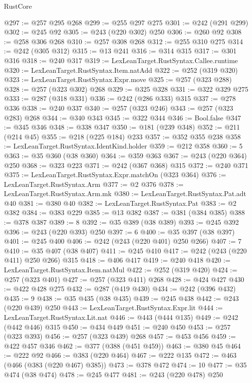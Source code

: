 \begin{lexlean}{RustCore}
\begin{coremodule}
{\begin{coremodule}
{{{{{{@297 := @257 @295 @268
@299 := @255 @297 @275
@301 := @242 (@291 @299)
@302 := @245 @92
@305 := @243 (@220 @302) @250
@306 := @260 @92
@308 := @258 @306 @268
@310 := @257 @308 @268
@312 := @255 @310 @275
@314 := @242 (@305 @312)
@315 := @13 @241
@316 := @314 @315
@317 := @301 @316
@318 := @240 @317
@319 := LexLeanTarget.RustSyntax.Callee.runtime
@320 := LexLeanTarget.RustSyntax.Item.natAdd
@322 := @252 (@319 @320)
@323 := LexLeanTarget.RustSyntax.Expr.move
@325 := @257 (@323 @288)
@328 := @257 (@323 @302) @268
@329 := @325 @328
@331 := @322 @329 @275
@333 := @287 (@318 @331)
@336 := @242 (@286 @333) @315
@337 := @278 @336
@338 := @240 @337
@340 := @257 (@323 @246)
@343 := @257 (@323 @283) @268
@344 := @340 @343
@345 := @322 @344
@346 := Bool.false
@347 := @345 @346
@348 := @338 @347
@350 := @181 (@239 @348)
@352 := @211 (@214 @45)
@355 := @218 (@225 @184) @233
@357 := @352 @355 @238
@358 := LexLeanTarget.RustSyntax.IdentKind.holder
@359 := @212 @358
@360 := 5
@363 := @35 @360 (@38 @360)
@364 := @359 @363
@367 := @243 (@220 @364) @250
@368 := @323 @223
@371 := @242 (@367 @368) @315
@372 := @240 @371
@375 := LexLeanTarget.RustSyntax.Expr.matchOn (@323 @364)
@376 := LexLeanTarget.RustSyntax.Arm
@377 := @2 @376
@378 := LexLeanTarget.RustSyntax.Arm.mk
@380 := LexLeanTarget.RustSyntax.Pat.adt @40
@381 := @380 @40
@382 := LexLeanTarget.RustSyntax.Pat
@383 := @2 @382
@384 := @383 @229
@385 := @13 @382
@387 := @381 (@384 @385)
@388 := @378 @387
@389 := 8
@392 := @35 @389 (@38 @389)
@393 := @245 @392
@396 := @243 (@220 @393) @250
@397 := 6
@400 := @35 @397 (@38 @397)
@401 := @245 @400
@406 := @242 (@243 (@220 @401) @250 @266)
@407 := 7
@410 := @35 @407 (@38 @407)
@411 := @245 @410
@417 := @242 (@243 (@220 @411) @250 @266) @315
@418 := @406 @417
@419 := @240 @418
@420 := LexLeanTarget.RustSyntax.Item.natMul
@422 := @252 (@319 @420)
@424 := @257 (@323 @401)
@427 := @257 (@323 @411) @268
@428 := @424 @427
@430 := @422 @428 @275
@432 := @287 (@419 @430)
@434 := @242 (@396 @432)
@435 := 9
@438 := @35 @435 (@38 @435)
@439 := @245 @438
@442 := @243 (@220 @439) @250
@443 := LexLeanTarget.RustSyntax.Expr.lit
@444 := LexLeanTarget.RustSyntax.Lit.nat
@446 := @443 (@444 @135)
@449 := @242 (@442 @446) @315
@450 := @434 @449
@451 := @240 @450
@453 := @257 (@323 @393)
@456 := @257 (@323 @439) @268
@457 := @453 @456
@459 := @422 @457 @346
@462 := @377 (@388 (@451 @459))
@463 := @380 @45
@464 := @222 @92
@466 := @383 (@220 @464)
@467 := @222 @135
@472 := @463 (@466 (@383 (@220 @467) @385))
@473 := @378 @472
@474 := 10
@477 := @35 @474 (@38 @474)
@478 := @245 @477
@481 := @243 (@220 @478) @250
}}}}}}
\end{coremodule}}
\end{coremodule}
\end{lexlean}
